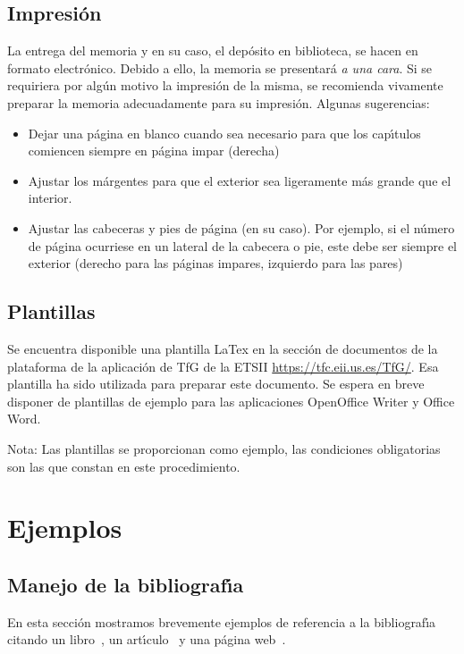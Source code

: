 \section{Impresión}\label{sec:impresion} 
La entrega del memoria y en su caso, el dep\'osito en biblioteca, se hacen en formato electr\'onico. Debido a ello, la memoria se presentará \emph{a una cara}. Si se requiriera
por alg\'un motivo la impresi\'on de la misma, se recomienda vivamente preparar la memoria adecuadamente para su impresi\'on. Algunas sugerencias:
\begin{itemize}
 \item Dejar una p\'agina en blanco cuando sea necesario para que los cap{\'\i}tulos comiencen siempre en p\'agina impar (derecha)
 \item Ajustar los m\'argentes para que el exterior sea ligeramente m\'as grande que el interior.
 \item Ajustar las cabeceras y pies de p\'agina (en su caso). Por ejemplo, si el n\'umero de p\'agina ocurriese en un lateral
 de la cabecera o pie, este debe ser siempre el exterior (derecho para las p\'aginas impares, izquierdo para las pares)
\end{itemize}

\section{Plantillas}\label{sec:plantillas} 

Se encuentra disponible una plantilla LaTex en la secci\'on de documentos de la plataforma
de la aplicaci\'on de TfG de la ETSII 
\url{https://tfc.eii.us.es/TfG/}. Esa plantilla ha sido utilizada para preparar este documento.
Se espera en breve disponer de plantillas de ejemplo para las aplicaciones OpenOffice Writer y Office Word.

Nota: Las plantillas se proporcionan como ejemplo, las condiciones obligatorias son las que constan en este procedimiento.

\chapter{Ejemplos}\label{cap2} 
					
\section{Manejo de la bibliograf{\'\i}a}
En esta secci\'on mostramos brevemente ejemplos de referencia a la bibliograf{\'\i}a citando un libro~\cite{desousa}, un art{\'\i}culo~\cite{guiatitlesec} y una p\'agina web~\cite{informatica}. 


